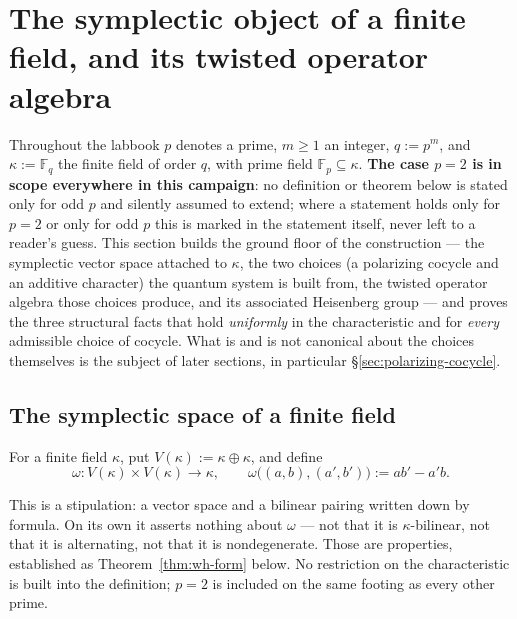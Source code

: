 \section{The symplectic object of a finite field, and its twisted operator algebra}
\label{sec:foundations}

Throughout the labbook $p$ denotes a prime, $m \geq 1$ an integer, $q := p^m$,
and $\kappa := \mathbb{F}_q$ the finite field of order $q$, with prime field
$\mathbb{F}_p \subseteq \kappa$. \textbf{The case $p = 2$ is in scope
everywhere in this campaign}: no definition or theorem below is stated only
for odd $p$ and silently assumed to extend; where a statement holds only for
$p=2$ or only for odd $p$ this is marked in the statement itself, never left
to a reader's guess. This section builds the ground floor of the
construction — the symplectic vector space attached to $\kappa$, the two
choices (a polarizing cocycle and an additive character) the quantum system
is built from, the twisted operator algebra those choices produce, and its
associated Heisenberg group — and proves the three structural facts that hold
\emph{uniformly} in the characteristic and for \emph{every} admissible choice
of cocycle. What is and is not canonical about the choices themselves is the
subject of later sections, in particular \S\ref{sec:polarizing-cocycle}.

\subsection{The symplectic space of a finite field}

\begin{definition}
\label{def:symplectic-object}
For a finite field $\kappa$, put $V(\kappa) := \kappa \oplus \kappa$, and
define
\[
\omega : V(\kappa) \times V(\kappa) \to \kappa, \qquad
\omega\big((a,b),(a',b')\big) := ab' - a'b .
\]
\end{definition}

\begin{scope}
This is a stipulation: a vector space and a bilinear pairing written down by
formula. On its own it asserts nothing about $\omega$ — not that it is
$\kappa$-bilinear, not that it is alternating, not that it is nondegenerate.
Those are properties, established as Theorem~\ref{thm:wh-form} below. No
restriction on the characteristic is built into the definition; $p=2$ is
included on the same footing as every other prime.
\end{scope}

